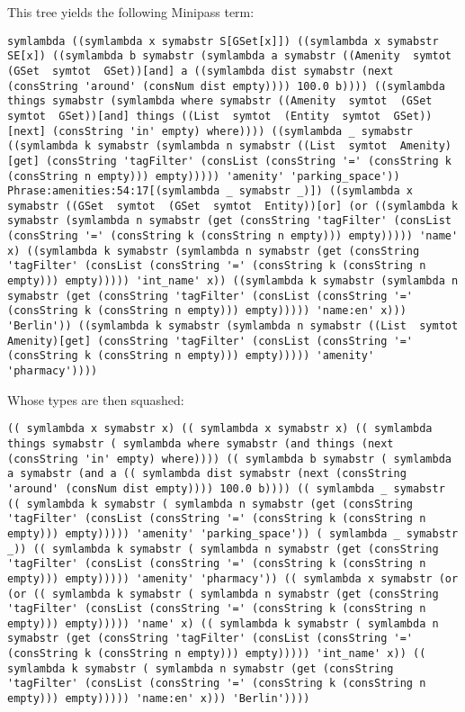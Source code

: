 \documentclass[main.tex]{subfiles}
\begin{document}
This tree yields the following Minipass term:
\begin{lstlisting}
symlambda ((symlambda x symabstr S[GSet[x]]) ((symlambda x symabstr SE[x]) ((symlambda b symabstr (symlambda a symabstr ((Amenity  symtot  (GSet  symtot  GSet))[and] a ((symlambda dist symabstr (next (consString 'around' (consNum dist empty)))) 100.0 b)))) ((symlambda things symabstr (symlambda where symabstr ((Amenity  symtot  (GSet  symtot  GSet))[and] things ((List  symtot  (Entity  symtot  GSet))[next] (consString 'in' empty) where)))) ((symlambda _ symabstr ((symlambda k symabstr (symlambda n symabstr ((List  symtot  Amenity)[get] (consString 'tagFilter' (consList (consString '=' (consString k (consString n empty))) empty))))) 'amenity' 'parking_space')) Phrase:amenities:54:17[(symlambda _ symabstr _)]) ((symlambda x symabstr ((GSet  symtot  (GSet  symtot  Entity))[or] (or ((symlambda k symabstr (symlambda n symabstr (get (consString 'tagFilter' (consList (consString '=' (consString k (consString n empty))) empty))))) 'name' x) ((symlambda k symabstr (symlambda n symabstr (get (consString 'tagFilter' (consList (consString '=' (consString k (consString n empty))) empty))))) 'int_name' x)) ((symlambda k symabstr (symlambda n symabstr (get (consString 'tagFilter' (consList (consString '=' (consString k (consString n empty))) empty))))) 'name:en' x))) 'Berlin')) ((symlambda k symabstr (symlambda n symabstr ((List  symtot  Amenity)[get] (consString 'tagFilter' (consList (consString '=' (consString k (consString n empty))) empty))))) 'amenity' 'pharmacy'))))
\end{lstlisting}

Whose types are then squashed:
\begin{lstlisting}
(( symlambda x symabstr x) (( symlambda x symabstr x) (( symlambda things symabstr ( symlambda where symabstr (and things (next (consString 'in' empty) where)))) (( symlambda b symabstr ( symlambda a symabstr (and a (( symlambda dist symabstr (next (consString 'around' (consNum dist empty)))) 100.0 b)))) (( symlambda _ symabstr (( symlambda k symabstr ( symlambda n symabstr (get (consString 'tagFilter' (consList (consString '=' (consString k (consString n empty))) empty))))) 'amenity' 'parking_space')) ( symlambda _ symabstr _)) (( symlambda k symabstr ( symlambda n symabstr (get (consString 'tagFilter' (consList (consString '=' (consString k (consString n empty))) empty))))) 'amenity' 'pharmacy')) (( symlambda x symabstr (or (or (( symlambda k symabstr ( symlambda n symabstr (get (consString 'tagFilter' (consList (consString '=' (consString k (consString n empty))) empty))))) 'name' x) (( symlambda k symabstr ( symlambda n symabstr (get (consString 'tagFilter' (consList (consString '=' (consString k (consString n empty))) empty))))) 'int_name' x)) (( symlambda k symabstr ( symlambda n symabstr (get (consString 'tagFilter' (consList (consString '=' (consString k (consString n empty))) empty))))) 'name:en' x))) 'Berlin'))))
\end{lstlisting}
\end{document}
